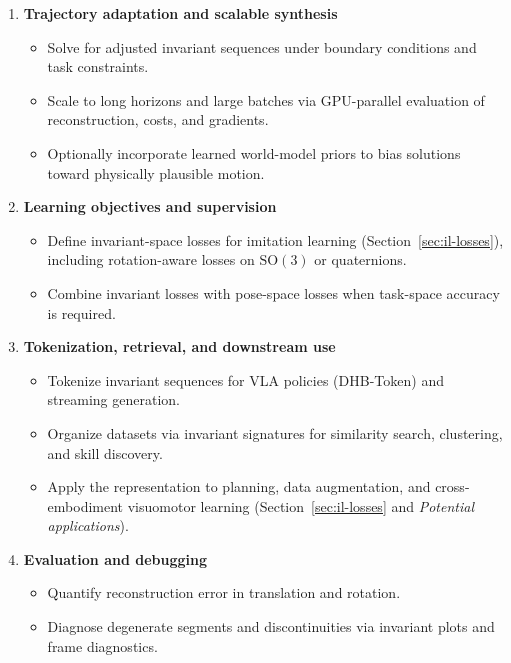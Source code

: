 \documentclass[11pt]{article}
\begin{document}
\begin{enumerate}
  \item \textbf{Trajectory adaptation and scalable synthesis}
    \begin{itemize}
      \item Solve for adjusted invariant sequences under boundary conditions and task constraints.
      \item Scale to long horizons and large batches via GPU-parallel evaluation of reconstruction, costs, and gradients.
      \item Optionally incorporate learned world-model priors to bias solutions toward physically plausible motion.
    \end{itemize}

  \item \textbf{Learning objectives and supervision}
    \begin{itemize}
      \item Define invariant-space losses for imitation learning (Section~\ref{sec:il-losses}), including rotation-aware losses on $\mathrm{SO}(3)$ or quaternions.
      \item Combine invariant losses with pose-space losses when task-space accuracy is required.
    \end{itemize}

  \item \textbf{Tokenization, retrieval, and downstream use}
    \begin{itemize}
      \item Tokenize invariant sequences for VLA policies (DHB-Token) and streaming generation.
      \item Organize datasets via invariant signatures for similarity search, clustering, and skill discovery.
      \item Apply the representation to planning, data augmentation, and cross-embodiment visuomotor learning (Section~\ref{sec:il-losses} and \emph{Potential applications}).
    \end{itemize}

  \item \textbf{Evaluation and debugging}
    \begin{itemize}
      \item Quantify reconstruction error in translation and rotation.
      \item Diagnose degenerate segments and discontinuities via invariant plots and frame diagnostics.
    \end{itemize}
\end{enumerate}
\end{document}
